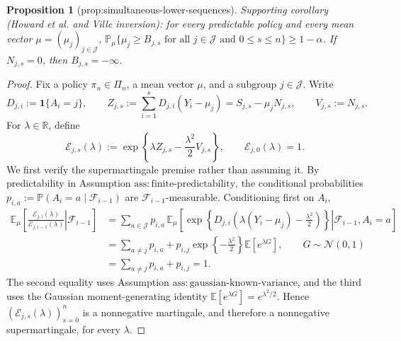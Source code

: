 \documentclass{article}
\newtheorem{proposition}{Proposition}
\begin{document}
\begin{proposition}[prop:simultaneous-lower-sequences]\label{prop:simultaneous-lower-sequences}
Supporting corollary (Howard et al. and Ville inversion): for every predictable policy and every mean vector \(\mu=(\mu_j)_{j\in\mathcal J}\), \(\mathbb P_\mu\{\mu_j\geq B_{j,s}\text{ for all }j\in\mathcal J\text{ and }0\leq s\leq n\}\geq1-\alpha\). If \(N_{j,s}=0\), then \(B_{j,s}=-\infty\).
\end{proposition}
\begin{proof}
Fix a policy \(\pi_n\in\Pi_n\), a mean vector \(\mu\), and a subgroup \(j\in\mathcal J\).  Write
\[
D_{j,i}:=\mathbf 1\{A_i=j\},\qquad
Z_{j,s}:=\sum_{i=1}^s D_{j,i}(Y_i-\mu_j)
=S_{j,s}-\mu_jN_{j,s},\qquad
V_{j,s}:=N_{j,s}.
\]
For \(\lambda\in\mathbb R\), define
\[
\mathcal E_{j,s}(\lambda)
:=\exp\!\left\{\lambda Z_{j,s}-\frac{\lambda^2}{2}V_{j,s}\right\},
\qquad \mathcal E_{j,0}(\lambda)=1.
\]
We first verify the supermartingale premise rather than assuming it.  By predictability in Assumption \(\mathrm{ass{:}finite\mbox{-}predictability}\), the conditional probabilities
\(p_{i,a}:=\mathbb P(A_i=a\mid\mathcal F_{i-1})\) are \(\mathcal F_{i-1}\)-measurable.  Conditioning first on \(A_i\),
\[
\begin{aligned}
\mathbb E_\mu\!\left[
\left.\frac{\mathcal E_{j,i}(\lambda)}{\mathcal E_{j,i-1}(\lambda)}
\right|\mathcal F_{i-1}\right]
&=\sum_{a\in\mathcal J}p_{i,a}\,
\mathbb E_\mu\!\left[
\left.\exp\!\left\{D_{j,i}\left(\lambda(Y_i-\mu_j)-\frac{\lambda^2}{2}\right)\right\}
\right|\mathcal F_{i-1},A_i=a\right]\\
&=\sum_{a\neq j}p_{i,a}
+p_{i,j}\exp\!\left\{-\frac{\lambda^2}{2}\right\}
\mathbb E\!\left[e^{\lambda G}\right],
\qquad G\sim\mathcal N(0,1)\\
&=\sum_{a\neq j}p_{i,a}+p_{i,j}=1.
\end{aligned}
\]
The second equality uses Assumption \(\mathrm{ass{:}gaussian\mbox{-}known\mbox{-}variance}\), and the third uses the Gaussian moment-generating identity
\(\mathbb E[e^{\lambda G}]=e^{\lambda^2/2}\).  Hence \((\mathcal E_{j,s}(\lambda))_{s=0}^n\) is a nonnegative martingale, and therefore a nonnegative supermartingale, for every \(\lambda\).


\end{proof}
\end{document}
